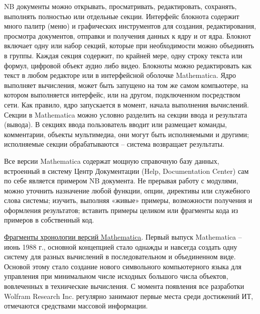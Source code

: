 NB документы можно открывать, просматривать, редактировать, сохранять, выполнять полностью или отдельные секции. Интерфейс блокнота содержит много палитр (меню) и графических инструментов для создания, редактирования, просмотра документов, отправки и получения данных к ядру и от ядра. Блокнот включает одну или набор секций, которые при необходимости можно объединять в группы. Каждая секция содержит, по крайней мере, одну строку текста или формул, цифровой объект аудио либо видео. Блокноты можно редактировать как текст в любом редакторе или в интерфейсной оболочке Mathematica. Ядро выполняет вычисления, может быть запущено на том же самом компьютере, на котором выполняется интерфейс, или на другом, подключенном посредством сети. Как правило, ядро запускается в момент, начала выполнения вычислений.
Секции в Mathematica можно условно разделить на секции ввода и результата (вывода). В секциях ввода пользователь вводит или размещает команды, комментарии, объекты мультимедиа, они могут быть исполняемыми и другими; исполняемые секции обрабатываются -- система возвращает результаты.

Все версии Mathematica содержат мощную справочную базу данных, встроенный в систему Центр Документации (Help, Documentation Center) сам по себе является примером NB документа. Не прерывая работу с модулями, можно уточнить назначение любой функции, опции, директивы или служебного слова системы; изучить, выполняя «живые» примеры, возможности получения и оформления результатов; вставить примеры целиком или фрагменты кода из примеров в собственный код.

\underline{Фрагменты хронологии версий Mathematica}.
Первый выпуск Mathematica – июнь 1988 г., основной концепцией стало однажды и навсегда создать одну систему для разных вычислений в последовательном и объединенном виде. Основой этому стало создание нового символьного компьютерного языка для управления при минимальном числе исходных большого числа объектов, вовлеченных в технические вычисления. С момента появления все разработки Wolfram Research Inc. регулярно занимают первые места среди достижений ИТ, отмечаются средствами массовой информации. 

